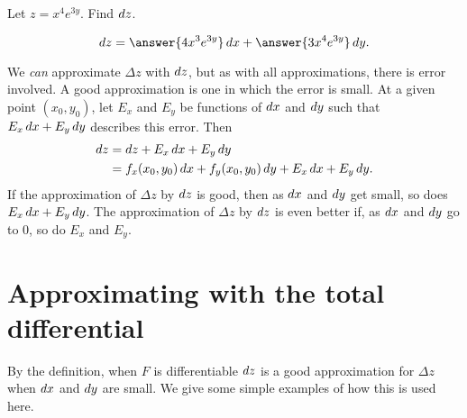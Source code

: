 \documentclass{ximera}
\begin{document}
\begin{question}
  Let $z = x^4e^{3y}$. Find $\mathop{}\!d z$.
  \begin{prompt}
    \[
    dz = \answer{4x^3e^{3y}}\d x+\answer{3x^4e^{3y}}\d y.
    \]
  \end{prompt}
\end{question}

We \textit{can} approximate $\Delta z$ with $\mathop{}\!d z$, but as with all
approximations, there is error involved. A good approximation is one
in which the error is small. At a given point $(x_0,y_0)$, let $E_x$
and $E_y$ be functions of $\mathop{}\!d x$ and $\mathop{}\!d y$ such that $E_x\mathop{}\!d x+E_y\mathop{}\!d
y$ describes this error. Then
\begin{align*}
\mathop{}\!d z &= dz + E_x\mathop{}\!d x+ E_y\mathop{}\!d y \\
		&= f_x(x_0,y_0)\mathop{}\!d x+f_y(x_0,y_0)\mathop{}\!d y + E_x\mathop{}\!d x+E_y\mathop{}\!d y.
\end{align*}
If the approximation of $\Delta z$ by $\mathop{}\!d z$ is good, then as $\mathop{}\!d x$
and $\mathop{}\!d y$ get small, so does $E_x\mathop{}\!d x+E_y\mathop{}\!d y$. The approximation of
$\Delta z$ by $\mathop{}\!d z$ is even better if, as $\mathop{}\!d x$ and $\mathop{}\!d y$ go to
$0$, so do $E_x$ and $E_y$. 


\section{Approximating with the total differential}

By the definition, when $F$ is differentiable $\mathop{}\!d z$ is a good
approximation for $\Delta z$ when $\mathop{}\!d x$ and $\mathop{}\!d y$ are small. We give
some simple examples of how this is used here.
\end{document}
